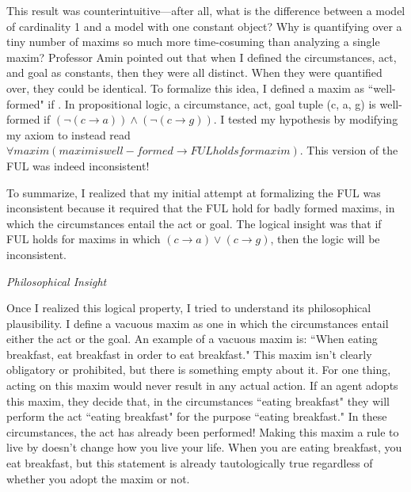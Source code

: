 \begin{isabellebody}
\begin{isamarkuptext}
This result was counterintuitive—after all, what is the difference between a model of cardinality 
1 and a model with one constant object? Why is quantifying over a tiny number of maxims so much 
more time-cosuming than analyzing a single maxim? Professor Amin pointed out that when I defined the 
circumstances, act, and goal as constants, then they were all distinct. When they were quantified over, 
they could be identical. To formalize this idea, I defined a maxim as ``well-formed" if . In propositional 
logic, a circumstance, act, goal tuple (c, a, g) is well-formed if $(\neg (c \longrightarrow a) ) \wedge 
(\neg(c \longrightarrow g))$. I tested my hypothesis by modifying my axiom to instead read $\forall maxim
(maxim is well-formed \longrightarrow FUL holds for maxim)$. This version of the FUL was indeed inconsistent!

To summarize, I realized that my initial attempt at formalizing the FUL was inconsistent because 
it required that the FUL hold for badly formed maxims, in which the circumstances entail the act or 
goal. The logical insight was that if FUL holds for maxims in which $(c \longrightarrow a) \vee 
(c \longrightarrow g)$, then the logic will be inconsistent.

\emph{Philosophical Insight}

Once I realized this logical property, I tried to understand its philosophical plausibility. I define
a vacuous maxim as one in which the circumstances entail either the act or the goal. An example
of a vacuous maxim is: ``When eating breakfast, eat breakfast in order to eat breakfast." This 
maxim isn't clearly obligatory or prohibited, but there is something empty about it. For one 
thing, acting on this maxim would never result in any actual action. If an agent adopts this maxim, 
they decide that, in the circumstances ``eating breakfast" they will perform the act ``eating breakfast"
for the purpose ``eating breakfast." In these circumstances, the act has 
already been performed! Making this maxim a rule to live by doesn't change how you live your life. 
When you are eating breakfast, you eat breakfast, but this statement is already 
tautologically true regardless of whether you adopt the maxim or not. 


\end{isamarkuptext}
\end{isabellebody}
